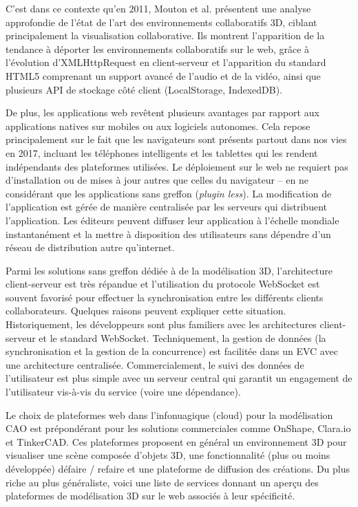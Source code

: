 C'est dans ce contexte qu'en 2011, Mouton et al. \cite{Mouton2011} présentent 
une analyse approfondie de l'état de l'art des environnements collaboratifs 
\gls{3D}, ciblant 
principalement la visualisation collaborative. 
Ils montrent l'apparition de la tendance à déporter les environnements collaboratifs 
sur le web, grâce à l'évolution d'XMLHttpRequest en client-serveur et l'apparition 
du standard HTML5 comprenant un support avancé de l'audio et de la vidéo, ainsi 
que plusieurs \gls{API} de stockage côté client (LocalStorage, IndexedDB). 

De plus, les applications web revêtent plusieurs avantages par rapport aux applications 
natives sur mobiles ou aux logiciels autonomes. 
Cela repose principalement sur le fait que les navigateurs sont présents partout 
dans nos vies en 2017, incluant les téléphones intelligents et les 
tablettes qui les rendent indépendants des plateformes utilisées. 
Le déploiement sur le web ne requiert pas d'installation ou de mises à jour autres 
que celles du navigateur -- en ne considérant que les applications sans greffon (\textit{plugin less}). 
La modification de l'application est gérée de manière centralisée par les serveurs 
qui distribuent l'application. 
Les éditeurs peuvent diffuser leur application à l'échelle mondiale instantanément  
et la mettre à disposition des utilisateurs sans dépendre d'un réseau de distribution 
autre qu'internet.


Parmi les solutions sans greffon dédiée à de la modélisation \gls{3D}, 
l'architecture client-serveur est très répandue
et l'utilisation du protocole \gls{WebSocket} est souvent favorisé pour 
effectuer la synchronisation entre les différents 
clients collaborateurs. Quelques raisons peuvent expliquer cette situation. 
Historiquement, les développeurs sont plus familiers avec les architectures 
client-serveur et le standard \gls{WebSocket}. Techniquement, la gestion de 
données (la synchronisation et la gestion de la concurrence) est facilitée 
dans un \gls{EVC} avec une architecture centralisée. 
Commercialement, le suivi des données de l'utilisateur est plus simple avec un 
serveur central qui garantit un engagement de l'utilisateur vis-à-vis du service 
(voire une dépendance).


%
Le choix de plateformes web dans l'infonuagique (\og cloud\fg{}) pour la 
modélisation \gls{CAO} est prépondérant pour les solutions commerciales comme 
OnShape, Clara.io et TinkerCAD. Ces plateformes 
proposent en général un environnement \gls{3D} pour visualiser une scène composée 
d'objets \gls{3D}, une fonctionnalité (plus ou moins développée) défaire / refaire 
et une plateforme de diffusion des créations. Du plus riche au plus généraliste, 
voici une liste de services donnant un aperçu des plateformes de modélisation 
\gls{3D} sur le web associés à leur spécificité.

